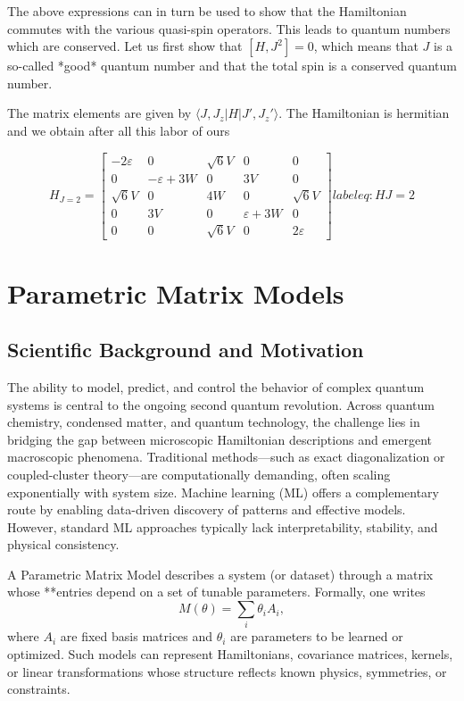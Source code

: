 \documentclass[twocolumn,superscriptaddress,unsortedaddress,nofootinbib,amsmath,amssymb,
aps,floatfix]{revtex4-2}
\begin{document}
The above expressions can in turn be used to show that the Hamiltonian
commutes with the various quasi-spin operators. This leads to quantum
numbers which are conserved.  Let us first show that $[H,J^2]=0$,
which means that $J$ is a so-called *good* quantum number and that the
total spin is a conserved quantum number.

The matrix elements are given by $\langle J,J_z \vert H \vert J',J_z' \rangle$.
The
Hamiltonian is hermitian and we obtain after all this labor of ours

\begin{equation}
H_{J = 2} =
\begin{bmatrix}
-2\varepsilon & 0 & \sqrt{6}V & 0 & 0 \\
0 & -\varepsilon + 3W & 0 & 3V & 0 \\
\sqrt{6}V & 0 & 4W & 0 & \sqrt{6}V \\
0 & 3V & 0 & \varepsilon + 3W & 0 \\
0 & 0 & \sqrt{6}V & 0 & 2\varepsilon
\end{bmatrix}
label{eq:HJ=2}
\end{equation}




\section{Parametric Matrix Models}

\subsection{Scientific Background and Motivation}

The ability to model, predict, and control the behavior of complex
quantum systems is central to the ongoing second quantum
revolution. Across quantum chemistry, condensed matter, and quantum
technology, the challenge lies in bridging the gap between microscopic
Hamiltonian descriptions and emergent macroscopic
phenomena. Traditional methods—such as exact diagonalization or
coupled-cluster theory—are computationally demanding, often scaling
exponentially with system size. Machine learning (ML) offers a
complementary route by enabling data-driven discovery of patterns and
effective models. However, standard ML approaches typically lack
interpretability, stability, and physical consistency.


A Parametric Matrix Model describes a system (or dataset) through a
matrix whose **entries depend on a set of tunable
parameters. Formally, one writes
\[
M(\theta) = \sum_i \theta_i A_i,
\]
where $A_i$ are fixed basis matrices and $\theta_i$ are parameters to
be learned or optimized.  Such models can represent Hamiltonians,
covariance matrices, kernels, or linear transformations whose
structure reflects known physics, symmetries, or constraints.
\end{document}
